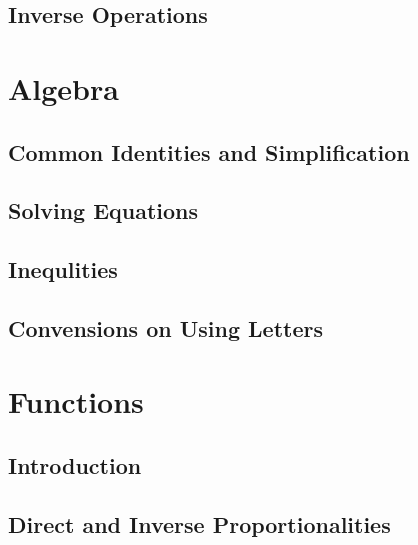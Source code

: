 \documentclass[
]{book}
\theoremstyle{definition}
\theoremstyle{definition}
\theoremstyle{definition}
\theoremstyle{definition}
\theoremstyle{remark}
\begin{document}
\hypertarget{inverse-operations}{%
\subsection{Inverse Operations}\label{inverse-operations}}

\hypertarget{algebra}{%
\section{Algebra}\label{algebra}}

\hypertarget{common-identities-and-simplification}{%
\subsection{Common Identities and Simplification}\label{common-identities-and-simplification}}

\hypertarget{solving-equations}{%
\subsection{Solving Equations}\label{solving-equations}}

\hypertarget{inequlities}{%
\subsection{Inequlities}\label{inequlities}}

\hypertarget{convensions-on-using-letters}{%
\subsection{Convensions on Using Letters}\label{convensions-on-using-letters}}

\hypertarget{functions}{%
\section{Functions}\label{functions}}

\hypertarget{introduction}{%
\subsection{Introduction}\label{introduction}}

\hypertarget{direct-and-inverse-proportionalities}{%
\subsection{Direct and Inverse Proportionalities}\label{direct-and-inverse-proportionalities}}
\end{document}

